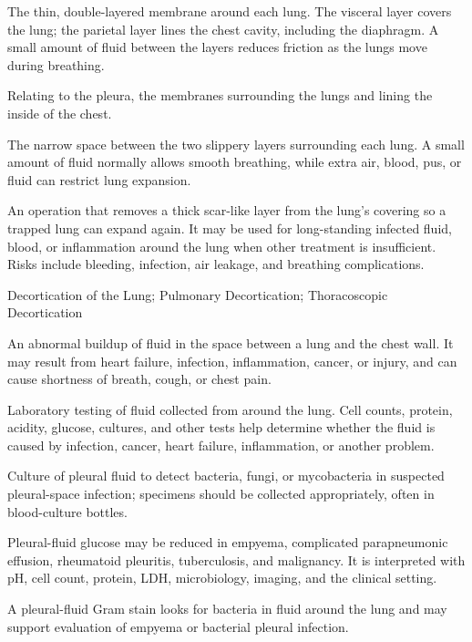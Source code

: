 The thin, double-layered membrane around each lung. The visceral layer covers the lung; the parietal layer lines the chest cavity, including the diaphragm. A small amount of fluid between the layers reduces friction as the lungs move during breathing.

 Relating to the pleura, the membranes surrounding the lungs and lining the inside of the chest.

 The narrow space between the two slippery layers surrounding each lung. A small amount of fluid normally allows smooth breathing, while extra air, blood, pus, or fluid can restrict lung expansion.

 An operation that removes a thick scar-like layer from the lung’s covering so a trapped lung can expand again. It may be used for long-standing infected fluid, blood, or inflammation around the lung when other treatment is insufficient. Risks include bleeding, infection, air leakage, and breathing complications.

\synonyms
Decortication of the Lung; Pulmonary Decortication; Thoracoscopic Decortication

 An abnormal buildup of fluid in the space between a lung and the chest wall. It may result from
heart failure, infection, inflammation, cancer, or injury, and can cause shortness of breath, cough, or chest pain.

 Laboratory testing of fluid collected from around the lung. Cell counts, protein, acidity, glucose, cultures, and other tests help determine whether the fluid is caused by infection, cancer, heart failure, inflammation, or another problem.

 Culture of pleural fluid to detect bacteria, fungi, or mycobacteria in suspected pleural-space infection; specimens should be collected appropriately, often in blood-culture bottles.

 Pleural-fluid glucose may be reduced in empyema, complicated parapneumonic effusion, rheumatoid
pleuritis, tuberculosis, and malignancy. It is interpreted with pH, cell count, protein, LDH,
microbiology, imaging, and the clinical setting.

 A pleural-fluid Gram stain looks for bacteria in fluid around the lung and may support evaluation of empyema or bacterial pleural infection.

